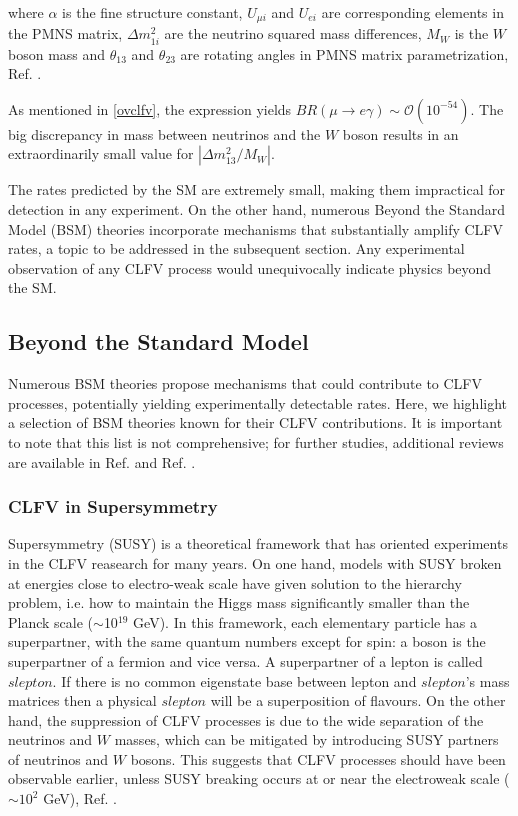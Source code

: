 where $\alpha$ is the fine structure constant, $U_{\mu i}$ and $U_{ei}$ are 
corresponding elements in the PMNS matrix, $\Delta m_{1i}^2$ are the neutrino 
squared mass differences, $M_W$ is the $W$ boson mass and $\theta_{13}$ and 
$\theta_{23}$ are rotating angles in PMNS matrix parametrization, Ref. \cite{MARCIANO1977303}.

As mentioned in \ref{ovclfv}, the expression yields $B R(\mu \rightarrow e \gamma) \sim \mathcal{O}(10^{-54})$. 
The big discrepancy in mass between neutrinos and the $W$ boson results in an 
extraordinarily small value for $|\Delta m_{13}^2/M_W|$.


The rates predicted by the SM are extremely small, 
making them impractical for detection in any experiment. On the 
other hand, numerous Beyond the Standard Model (BSM) theories 
incorporate mechanisms that substantially amplify CLFV rates, a 
topic to be addressed in the subsequent section. Any experimental observation of 
any CLFV process would unequivocally indicate physics beyond the SM.

\subsection{Beyond the Standard Model}
Numerous BSM theories propose mechanisms that could contribute to 
CLFV processes, potentially yielding experimentally detectable rates. 
Here, we highlight a selection of BSM theories known for their CLFV 
contributions. It is important to note that this list is not 
comprehensive; for further studies, additional reviews are available 
in Ref. \cite{clfv_signorelli} and Ref. \cite{universe8060299}.
\subsubsection{CLFV in Supersymmetry}\label{susy}
Supersymmetry (SUSY) is a theoretical framework that has oriented 
experiments in the CLFV reasearch for many years. On one hand, 
models with SUSY broken at energies close to electro-weak scale 
have given solution to the hierarchy problem, i.e. how to maintain 
the Higgs mass significantly smaller than the Planck scale ($\sim$10$^{19}$ GeV). 
In this framework, each elementary particle has a superpartner, 
with the same quantum numbers except for spin: a boson is the superpartner 
of a fermion and vice versa. A superpartner of a lepton is called $slepton$. 
If there is no common eigenstate base between lepton and $slepton$'s mass 
matrices then a physical $slepton$ will be a superposition of flavours.
On the other hand, the suppression of CLFV processes is due to the wide 
separation of the neutrinos and $W$ masses, which can be mitigated by 
introducing SUSY partners of neutrinos and $W$ bosons. This suggests 
that CLFV processes should have been observable earlier, unless SUSY 
breaking occurs at or near the electroweak scale ($\sim 10^2$ GeV), Ref. \cite{clfv_signorelli}.

